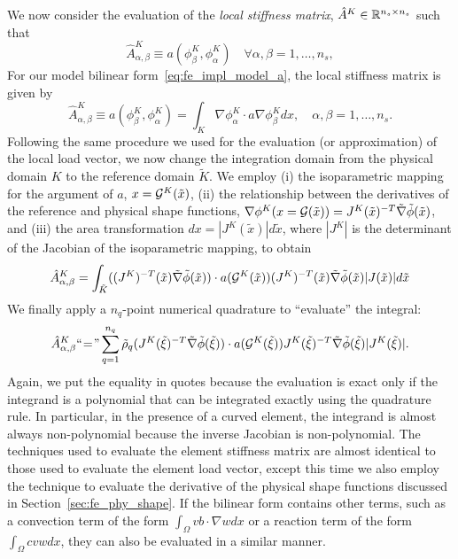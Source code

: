 We now consider the evaluation of the \emph{local stiffness matrix}, $\hat A^K \in \mathbb{R}^{n_s \times n_s}$ such that
\begin{equation*}
  \hat A^K_{\alpha,\beta} \equiv a(\phi^K_\beta,\phi^K_\alpha) \quad \forall \alpha,\beta = 1,\dots,n_s,
\end{equation*}
For our model bilinear form~\eqref{eq:fe_impl_model_a}, the local stiffness matrix is given by
\begin{equation*}
  \hat A^K_{\alpha,\beta}
  \equiv
  a(\phi^K_\beta,\phi^K_\alpha) = \int_K \nabla \phi^K_\alpha \cdot a \nabla \phi^K_\beta dx , \quad \alpha,\beta = 1,\dots,n_s.
\end{equation*}
Following the same procedure we used for the evaluation (or approximation) of the local load vector, we now change the integration domain from the physical domain $K$ to the reference domain $\tilde K$.  We employ (i) the isoparametric mapping for the argument of $a$, $x = \mathcal{G}^K(\tilde x)$, (ii) the relationship between the derivatives of the reference and physical shape functions, $\nabla \phi^K(x = \mathcal{G}(\tilde x)) = J^K(\tilde x)^{-T} \tilde \nabla \tilde \phi(\tilde x)$, and (iii) the area transformation $dx = |J^K(\tilde x)| d \tilde x$, where $|J^K|$ is the determinant of the Jacobian of the isoparametric mapping, to obtain
\begin{equation}
  \hat A^K_{\alpha,\beta}
  =
  \int_{\tilde K} ((J^K)^{-T}(\tilde x) \tilde \nabla \tilde \phi(\tilde x))
  \cdot a(\mathcal{G}^K(\tilde x)) (J^K)^{-T}(\tilde x) \tilde \nabla \tilde \phi(\tilde x)
  |J(\tilde x)| d\tilde x
  \label{eq:fe_impl_loc_mat_2}
\end{equation}
We finally apply a $n_q$-point numerical quadrature to ``evaluate'' the integral:
\begin{equation*}
  \hat A^K_{\alpha,\beta}
  \text{``}\hspace{-0.2em}=\hspace{-0.2em}\text{''}
  \sum_{q=1}^{n_q} \tilde \rho_q
   (J^K(\tilde \xi)^{-T} \tilde \nabla \tilde \phi(\tilde \xi))
  \cdot a(\mathcal{G}^K(\tilde \xi)) J^K(\tilde \xi)^{-T} \tilde \nabla \tilde \phi(\tilde \xi)
  |J^K(\tilde \xi)|.
\end{equation*}
Again, we put the equality in quotes because the evaluation is exact only if the integrand is a polynomial that can be integrated exactly using the quadrature rule.  In particular, in the presence of a curved element, the integrand is almost always non-polynomial because the inverse Jacobian is non-polynomial. The techniques used to evaluate the element stiffness matrix are almost identical to those used to evaluate the element load vector, except this time we also employ the technique to evaluate the derivative of the physical shape functions discussed in Section~\ref{sec:fe_phy_shape}. If the bilinear form contains other terms, such as a convection term of the form $\int_{\Omega} v b \cdot \nabla w dx$ or a reaction term of the form $\int_\Omega c v w dx$, they can also be evaluated in a similar manner.


